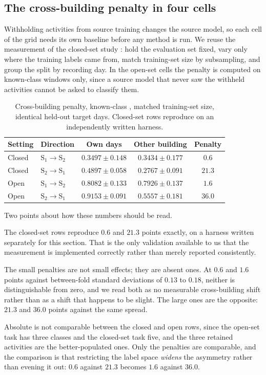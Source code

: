 \subsection{The cross-building penalty in four cells}
\label{sec:os-penalty}

Withholding activities from source training changes the source model, so each cell of the
grid needs its own baseline before any method is run. We reuse the measurement of
the closed-set study \cite{kbaier_closedset}: hold the evaluation set fixed, vary only where the training
labels came from, match training-set size by subsampling, and group the split by recording
day. In the open-set cells the penalty is computed on known-class windows only, since a
source model that never saw the withheld activities cannot be asked to classify them.

\begin{table}[t]
\centering
\caption{Cross-building penalty, known-class \macf, matched training-set size, identical
held-out target days. Closed-set rows reproduce \cite{kbaier_closedset} on an
independently written harness.}
\label{tab:ospenalty}
\small
\begin{tabular}{@{}llccc@{}}
\toprule
Setting & Direction & Own days & Other building & Penalty \\
\midrule
Closed & $\text{S}_1\!\to\!\text{S}_2$ & $0.3497\pm0.148$ & $0.3434\pm0.177$ & $0.6$ \\
Closed & $\text{S}_2\!\to\!\text{S}_1$ & $0.4897\pm0.058$ & $0.2767\pm0.091$ & $21.3$ \\
Open   & $\text{S}_1\!\to\!\text{S}_2$ & $0.8082\pm0.133$ & $0.7926\pm0.137$ & $1.6$ \\
Open   & $\text{S}_2\!\to\!\text{S}_1$ & $0.9153\pm0.091$ & $0.5557\pm0.181$ & $\mathbf{36.0}$ \\
\bottomrule
\end{tabular}
\end{table}

Two points about how these numbers should be read.

The closed-set rows reproduce $0.6$ and $21.3$ points exactly, on a harness written
separately for this section. That is the only validation available to us that the
measurement is implemented correctly rather than merely reported consistently.

The small penalties are not small effects; they are absent ones. At $0.6$ and $1.6$ points
against between-fold standard deviations of $0.13$ to $0.18$, neither is distinguishable
from zero, and we read both as no measurable cross-building shift rather than as a shift
that happens to be slight. The large ones are the opposite: $21.3$ and $36.0$ points
against the same spread.

Absolute \macf{} is not comparable between the closed and open rows, since the open-set
task has three classes and the closed-set task five, and the three retained activities are
the better-populated ones. Only the penalties are comparable, and the comparison is that
restricting the label space \emph{widens} the asymmetry rather than evening it out:
$0.6$ against $21.3$ becomes $1.6$ against $36.0$.
